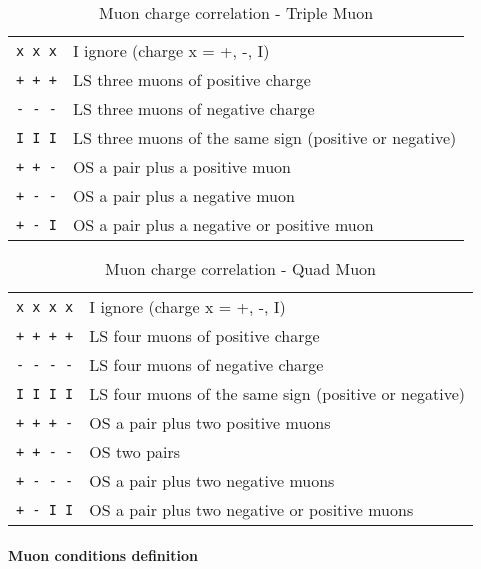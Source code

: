 \begin{table}[ht]
\caption{Muon charge correlation - Triple Muon}
\vspace{5mm}
\centering
\begin{tabular}{|c|l|}\hline
\verb|x x x| & I  ignore (charge x = +, -, I) \\
\verb|+ + +| & LS three muons of positive charge \\
\verb|- - -| & LS three muons of negative charge \\
\verb|I I I| & LS three muons of the same sign (positive or negative) \\
\verb|+ + -| & OS a pair plus a positive muon \\
\verb|+ - -| & OS a pair plus a negative muon \\
\verb|+ - I| & OS a pair plus a negative or positive muon \\\hline
\end{tabular}
\label{tab:gtl:muon_charge_corr_triple}
\end{table}

\begin{table}[ht]
\caption{Muon charge correlation - Quad Muon}
\vspace{5mm}
\centering
\begin{tabular}{|c|l|}\hline
\verb|x x x x| & I  ignore (charge x = +, -, I) \\
\verb|+ + + +| & LS four muons of positive charge \\
\verb|- - - -| & LS four muons of negative charge \\
\verb|I I I I| & LS four muons of the same sign (positive or negative) \\
\verb|+ + + -| & OS a pair plus two positive muons \\
\verb|+ + - -| & OS two pairs \\
\verb|+ - - -| & OS a pair plus two negative muons \\
\verb|+ - I I| & OS a pair plus two negative or positive muons \\\hline
\end{tabular}
\label{tab:gtl:muon_charge_corr_quad}
\end{table}

\clearpage

\paragraph{Muon conditions definition}
\label{sec:gtl:muon_cond_def}

